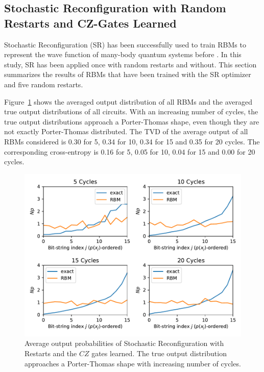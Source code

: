 \subsection{Stochastic Reconfiguration with Random Restarts and CZ-Gates Learned}

Stochastic Reconfiguration (SR) has been successfully used to train RBMs to represent the wave function 
of many-body quantum systems before \cite{}. In this study, SR has been applied once with random restarts 
and without. 
This section summarizes the results of RBMs that have been trained with the SR optimizer and five random 
restarts.

Figure~\ref{fig:sr_avgPDF} shows the averaged output distribution of all RBMs and 
the averaged true output distributions of all circuits. With an increasing number of cycles, the 
true output distributions approach a Porter-Thomas shape, even though they are not exactly Porter-Thomas 
distributed.
The TVD of the average output of all RBMs considered 
is 0.30 for 5, 0.34 for 10, 0.34 for 15 and 0.35 for 20 cycles. The corresponding cross-entropy is 
0.16 for 5, 0.05 for 10, 0.04 for 15 and 0.00 for 20 cycles.

\begin{figure}[H]
  \centering
  \includegraphics[width=\textwidth]{figures/results/SR-restarts-learned/avgPDF.pdf}
  \caption[Average output probabilities of Stochastic Reconfiguration with Restarts Learned]{
    Average output probabilities of Stochastic Reconfiguration with Restarts and the $CZ$ gates learned. The true 
    output distribution approaches a Porter-Thomas shape with increasing number of cycles.}
  \label{fig:sr_avgPDF}
\end{figure}


